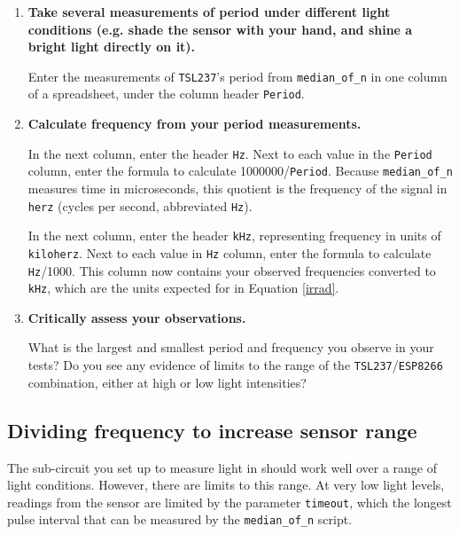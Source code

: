 {\begin{enumerate}[resume]
	\smallskip
	Except when testing, it's often helpful to set \lstinline{verbose=False}, to see only the second line of this output (the median of measured periods, and whether the measurements completed successfully).

	\item \textbf{Take several measurements of period under different light conditions (e.g. shade the sensor with your hand, and shine a bright light directly on it).}

	Enter the measurements of \texttt{TSL237}'s period from \lstinline{median_of_n} in one column of a spreadsheet, under the column header \texttt{Period}.

	\item \textbf{Calculate frequency from your period measurements.}

	In the next column, enter the header \texttt{Hz}.
	Next to each value in the \texttt{Period} column, enter the formula to calculate 1000000/\texttt{Period}.
	Because \lstinline{median_of_n} measures time in microseconds, this quotient is the frequency of the signal in \texttt{herz} (cycles per second, abbreviated \texttt{Hz}).

	\smallskip
	In the next column, enter the header \texttt{kHz}, representing frequency in units of \texttt{kiloherz}.
	Next to each value in \texttt{Hz} column, enter the formula to calculate \texttt{Hz}/1000.
	This column now contains your observed frequencies converted to \texttt{kHz}, which are the units expected for in Equation \ref{irrad}.

	\item \textbf{Critically assess your observations.}

	What is the largest and smallest period and frequency you observe in your tests?
	Do you see any evidence of limits to the range of the \texttt{TSL237}/\texttt{ESP8266} combination, either at high or low light intensities?
\end{enumerate}


\subsection{Dividing frequency to increase sensor range}
The sub-circuit you set up to measure light in  should work well over a range of light conditions.
However, there are limits to this range.
At very low light levels, readings from the sensor are limited by the parameter \texttt{timeout}, which the longest pulse interval that can be measured by the \lstinline{median_of_n} script.

}
